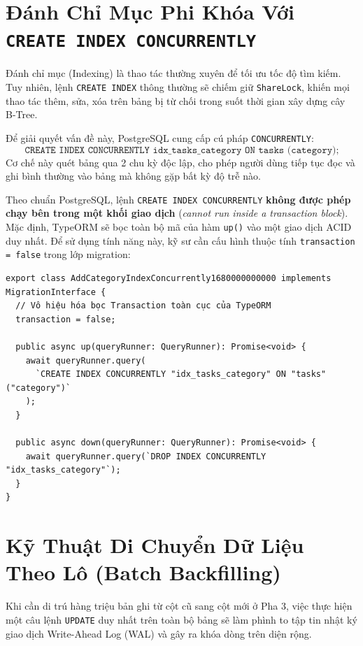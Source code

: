 \documentclass[12pt,a4paper,oneside]{book}
\begin{document}
\section{Đánh Chỉ Mục Phi Khóa Với \texttt{CREATE INDEX CONCURRENTLY}}
Đánh chỉ mục (Indexing) là thao tác thường xuyên để tối ưu tốc độ tìm kiếm. Tuy nhiên, lệnh \texttt{CREATE INDEX} thông thường sẽ chiếm giữ \texttt{ShareLock}, khiến mọi thao tác thêm, sửa, xóa trên bảng bị từ chối trong suốt thời gian xây dựng cây B-Tree.

Để giải quyết vấn đề này, PostgreSQL cung cấp cú pháp \texttt{CONCURRENTLY}:
\begin{equation}
  \texttt{CREATE INDEX CONCURRENTLY idx\_tasks\_category ON tasks (category);}
\end{equation}
Cơ chế này quét bảng qua 2 chu kỳ độc lập, cho phép người dùng tiếp tục đọc và ghi bình thường vào bảng mà không gặp bất kỳ độ trễ nào.

\begin{infobox}
  Theo chuẩn PostgreSQL, lệnh \texttt{CREATE INDEX CONCURRENTLY} \textbf{không được phép chạy bên trong một khối giao dịch} (\textit{cannot run inside a transaction block}). Mặc định, TypeORM sẽ bọc toàn bộ mã của hàm \texttt{up()} vào một giao dịch ACID duy nhất. Để sử dụng tính năng này, kỹ sư cần cấu hình thuộc tính \texttt{transaction = false} trong lớp migration:
\begin{Verbatim}[fontsize=\small]
export class AddCategoryIndexConcurrently1680000000000 implements MigrationInterface {
  // Vô hiệu hóa bọc Transaction toàn cục của TypeORM
  transaction = false;

  public async up(queryRunner: QueryRunner): Promise<void> {
    await queryRunner.query(
      `CREATE INDEX CONCURRENTLY "idx_tasks_category" ON "tasks" ("category")`
    );
  }

  public async down(queryRunner: QueryRunner): Promise<void> {
    await queryRunner.query(`DROP INDEX CONCURRENTLY "idx_tasks_category"`);
  }
}
\end{Verbatim}
\end{infobox}

\section{Kỹ Thuật Di Chuyển Dữ Liệu Theo Lô (Batch Backfilling)}
Khi cần di trú hàng triệu bản ghi từ cột cũ sang cột mới ở Pha 3, việc thực hiện một câu lệnh \texttt{UPDATE} duy nhất trên toàn bộ bảng sẽ làm phình to tập tin nhật ký giao dịch Write-Ahead Log (WAL) và gây ra khóa dòng trên diện rộng.
\end{document}
